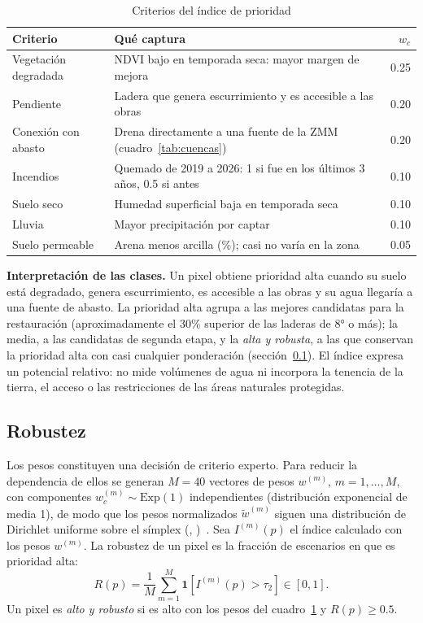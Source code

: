 \documentclass[11pt,letterpaper]{article}
\makeatletter
\newcommand{\citap}[1]{(\@nameuse{cautor@#1}, \@nameuse{canio@#1})~\cite{#1}}
\makeatother
\begin{document}
\begin{table}[H]\centering\small
\caption{Criterios del índice de prioridad}\label{tab:criterios}
\begin{tabularx}{\linewidth}{lXr}
\toprule
Criterio & Qué captura & $w_c$ \\
\midrule
Vegetación degradada & NDVI bajo en temporada seca: mayor margen de mejora & 0.25 \\
Pendiente & Ladera que genera escurrimiento y es accesible a las obras & 0.20 \\
Conexión con abasto & Drena directamente a una fuente de la ZMM (cuadro~\ref{tab:cuencas}) & 0.20 \\
Incendios & Quemado de 2019 a 2026: 1 si fue en los últimos 3 años, 0.5 si antes & 0.10 \\
Suelo seco & Humedad superficial baja en temporada seca & 0.10 \\
Lluvia & Mayor precipitación por captar & 0.10 \\
Suelo permeable & Arena menos arcilla (\%); casi no varía en la zona & 0.05 \\
\bottomrule
\end{tabularx}
\end{table}

\textbf{Interpretación de las clases.} Un pixel obtiene prioridad alta cuando su suelo está degradado, genera escurrimiento, es accesible a las obras y su agua llegaría a una fuente de abasto. La prioridad alta agrupa a las mejores candidatas para la restauración (aproximadamente el 30\% superior de las laderas de 8° o más); la media, a las candidatas de segunda etapa, y la \emph{alta y robusta}, a las que conservan la prioridad alta con casi cualquier ponderación (sección~\ref{sec:robustez}). El índice expresa un potencial relativo: no mide volúmenes de agua ni incorpora la tenencia de la tierra, el acceso o las restricciones de las áreas naturales protegidas.

\subsection{Robustez}\label{sec:robustez}

Los pesos constituyen una decisión de criterio experto. Para reducir la dependencia de ellos se generan $M=40$ vectores de pesos $w^{(m)}$, $m=1,\dots,M$, con componentes $w^{(m)}_c \sim \text{Exp}(1)$ independientes (distribución exponencial de media 1), de modo que los pesos normalizados $\tilde w^{(m)}$ siguen una distribución de Dirichlet uniforme sobre el símplex \citap{butler1997}. Sea $I^{(m)}(p)$ el índice calculado con los pesos $w^{(m)}$. La robustez de un pixel es la fracción de escenarios en que es prioridad alta:
\begin{equation}
R(p)=\frac{1}{M}\sum_{m=1}^{M}\mathbf{1}\!\left[I^{(m)}(p)>\tau_2\right]\in[0,1].
\end{equation}
Un pixel es \emph{alto y robusto} si es alto con los pesos del cuadro~\ref{tab:criterios} y $R(p)\ge 0.5$.
\end{document}
